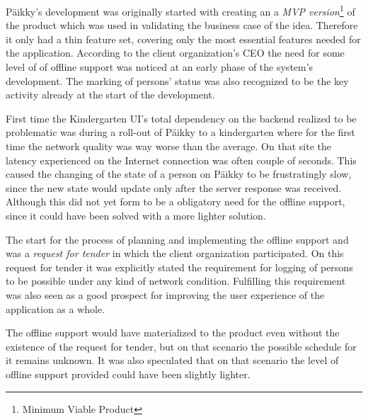 
Päikky's development was originally started with creating an a \textit{MVP version}\footnote{Minimum Viable Product} of the product which was used in validating the business case of the idea. Therefore it only had a thin feature set, covering only the most essential features needed for the application. According to the client organization's CEO the need for some level of of offline support was noticed at an early phase of the system's development. The marking of persons' status was also recognized to be the key activity already at the start of the development.

First time the Kindergarten UI's total dependency on the backend realized to be problematic was during a roll-out of Päikky to a kindergarten where for the first time the network quality was way worse than the average. On that site the latency experienced on the Internet connection was often couple of seconds. This caused the changing of the state of a person on Päikky to be frustratingly slow, since the new state would update only after the server response was received. Although this did not yet form to be a obligatory need for the offline support, since it could have been solved with a more lighter solution.

The start for the process of planning and implementing the offline support and was a \textit{request for tender} in which the client organization participated. On this request for tender it was explicitly stated the requirement for logging of persons to be possible under any kind of network condition. Fulfilling this requirement was also seen as a good prospect for improving the user experience of the application as a whole.

The offline support would have materialized to the product even without the existence of the request for tender, but on that scenario the possible schedule for it remains unknown. It was also speculated that on that scenario the level of offline support provided could have been slightly lighter.

















